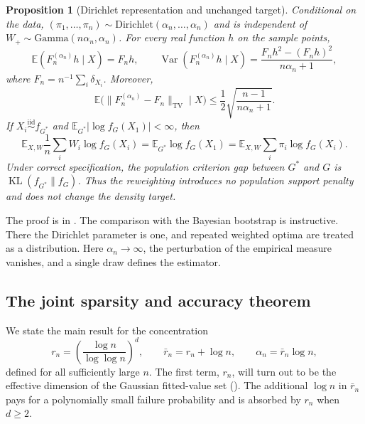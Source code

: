 \documentclass[11pt]{article}
\newtheorem{proposition}{Proposition}
\theoremstyle{definition}
\theoremstyle{remark}
\DeclareMathOperator{\KL}{KL}
\DeclareMathOperator{\TV}{TV}
\newcommand{\EE}{\mathbb E}
\newcommand{\norm}[1]{\lVert #1\rVert}
\newcommand{\abs}[1]{\lvert #1\rvert}
\begin{document}
\begin{proposition}[Dirichlet representation and unchanged target]
\label{prop:dirichlet}
Conditional on the data,
$(\pi_1,\ldots,\pi_n)\sim\mathrm{Dirichlet}(\alpha_n,\ldots,\alpha_n)$ and is
independent of $W_+\sim\mathrm{Gamma}(n\alpha_n,\alpha_n)$.  For every real
function $h$ on the sample points,
\[
 \EE(F_n^{(\alpha_n)}h\mid X)=F_nh,
 \qquad
 \operatorname{Var}(F_n^{(\alpha_n)}h\mid X)
 =\frac{F_nh^2-(F_nh)^2}{n\alpha_n+1},
\]
where $F_n=n^{-1}\sum_i\delta_{X_i}$.  Moreover,
\[
 \EE\bigl(\norm{F_n^{(\alpha_n)}-F_n}_{\TV}\mid X\bigr)
 \le \frac12\sqrt{\frac{n-1}{n\alpha_n+1}}.
\]
If $X_i\stackrel{\mathrm{iid}}\sim f_{G^*}$ and
$\EE_{G^*}\abs{\log f_G(X_1)}<\infty$, then
\[
 \EE_{X,W}\frac1n\sum_iW_i\log f_G(X_i)
 =\EE_{G^*}\log f_G(X_1)
 =\EE_{X,W}\sum_i\pi_i\log f_G(X_i).
\]
Under correct specification, the population criterion gap between $G^*$ and
$G$ is $\KL(f_{G^*}\|f_G)$.  Thus the reweighting introduces no population
support penalty and does not change the density target.
\end{proposition}

The proof is in .  The comparison with the Bayesian
bootstrap is instructive.  There the Dirichlet parameter is one, and repeated
weighted optima are treated as a distribution.  Here $\alpha_n\to\infty$, the
perturbation of the empirical measure vanishes, and a single draw defines the
estimator.

\subsection{The joint sparsity and accuracy theorem}

We state the main result for the concentration
\begin{equation}\label{eq:scales}
 r_n=\left(\frac{\log n}{\log\log n}\right)^d,
 \qquad \bar r_n=r_n+\log n,
 \qquad \alpha_n=\bar r_n\log n,
\end{equation}
defined for all sufficiently large $n$.  The first term, $r_n$, will turn out
to be the effective dimension of the Gaussian fitted-value set
().  The additional $\log n$ in $\bar r_n$ pays for a
polynomially small failure probability and is absorbed by $r_n$ when
$d\ge2$.
\end{document}

